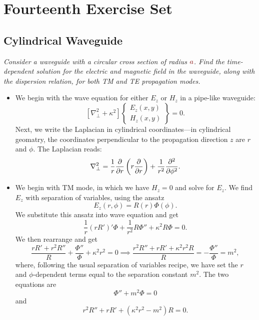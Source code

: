 \documentclass[11pt, a4paper]{article}
\newcommand{\dmath}[1]{\textcolor{Maroon}{#1}}  %
\renewcommand{\laplacian}{\nabla^{2}}
\begin{document}
\newpage
\section{Fourteenth Exercise Set}

\subsection{Cylindrical Waveguide}
\textit{Consider a waveguide with a circular cross section of radius $ \dmath{a} $. Find the time-dependent solution for the electric and magnetic field in the waveguide, along with the dispersion relation, for both TM and TE propagation modes.}

\begin{itemize}
	\item We begin with the wave equation for either $ E_{z} $ or $ H_{z} $ in a pipe-like waveguide:
	\begin{equation*}
		\left[\laplacian_{\perp} + \kappa^{2}\right]
		\begin{Bmatrix}
			E_{z}(x, y)\\
			H_{z}(x, y)
		\end{Bmatrix}
		 = 0.
	\end{equation*}
	Next, we write the Laplacian in cylindrical coordinates---in cylindrical geomatry, the coordinates perpendicular to the propagation direction $ z $ are $ r $ and $ \phi $. The Laplacian reads:
	\begin{equation*}
		\laplacian_{\perp} = \frac{1}{r}\pdv{r}\left(r \pdv{r}\right) + \frac{1}{r^{2}} \pdv[2]{}{\phi}.
	\end{equation*}

    \item We begin with TM mode, in which we have $ H_{z} = 0 $ and solve for $ E_{z} $. We find $ E_{z} $ with separation of variables, using the ansatz
	\begin{equation*}
        E_{z}(r, \phi) = R(r) \Phi(\phi) .
	\end{equation*}
	We substitute this ansatz into wave equation and get
	\begin{equation*}
		\frac{1}{r}\left(rR'\right)'\Phi + \frac{1}{r^{2}}R\Phi'' + \kappa^{2}R\Phi = 0.
	\end{equation*}
	We then rearrange and get
	\begin{equation*}
		\frac{rR' + r^{2}R''}{R} + \frac{\Phi''}{\Phi} + \kappa^{2}r^{2} = 0 \implies \frac{r^{2}R'' + rR' + \kappa^{2}r^{2}R}{R} = -\frac{\Phi''}{\Phi} = m^{2},
	\end{equation*}
	where, following the usual separation of variables recipe, we have set the $ r $ and $ \phi $-dependent terms equal to the separation constant $ m^{2} $. The two equations are
	\begin{equation*}
		\Phi'' + m^{2}\Phi = 0
	\end{equation*}
	and
	\begin{equation*}
		r^{2}R'' + rR' + (\kappa^{2}r^{2} - m^{2})R = 0.
	\end{equation*}
	

\end{itemize}
\end{document}
